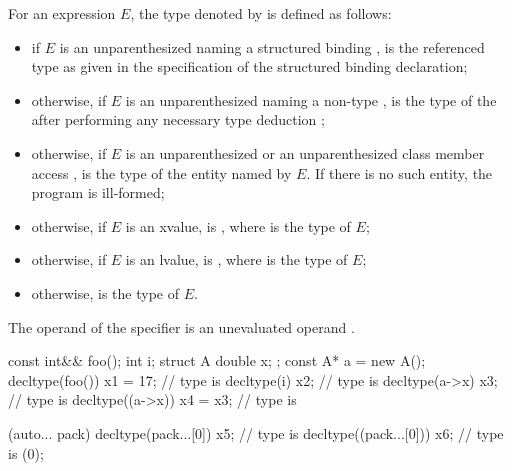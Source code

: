\documentclass{wg21}
\begin{document}
\pnum
{}%
For an expression $E$, the type denoted by  is defined as follows:
\begin{itemize}
\item if $E$ is an unparenthesized 
naming a structured binding ,
 is the referenced type as given in
the specification of the structured binding declaration;

\item otherwise, if $E$ is an unparenthesized 
naming a non-type  ,
 is the type of the 
after performing any necessary
type deduction ;

\item otherwise, if $E$ is an unparenthesized  or
an unparenthesized
class
member access ,  is the
type of the entity named by $E$.
If there is no such entity, the program is ill-formed;

\item otherwise, if $E$ is
an xvalue,  is , where  is the type
of $E$;

\item otherwise, if $E$ is an lvalue, 
is , where  is the type of $E$;

\item otherwise,  is the type of $E$.
\end{itemize}

The operand of the  specifier is an unevaluated
operand .

\begin{example}
    \begin{codeblock}
        const int&& foo();
        int i;
        struct A { double x; };
        const A* a = new A();
        decltype(foo()) x1 = 17;        // type is 
        decltype(i) x2;                 // type is 
        decltype(a->x) x3;              // type is 
        decltype((a->x)) x4 = x3;       // type is 
        \end{codeblock}
        \begin{addedblock}
        \begin{codeblock}
        [](auto... pack){
            decltype(pack...[0])   x5;  // type is 
            decltype((pack...[0])) x6;  // type is 
        }(0);
        \end{codeblock}
        \end{addedblock}
\end{example}
\end{document}
